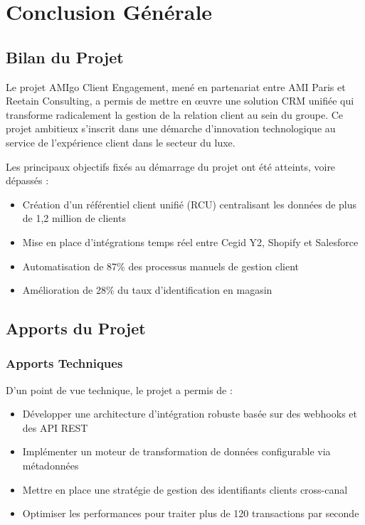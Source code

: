\chapter{Conclusion Générale}

\section{Bilan du Projet}

Le projet AMIgo Client Engagement, mené en partenariat entre AMI Paris et Reetain Consulting, a permis de mettre en œuvre une solution CRM unifiée qui transforme radicalement la gestion de la relation client au sein du groupe. Ce projet ambitieux s'inscrit dans une démarche d'innovation technologique au service de l'expérience client dans le secteur du luxe.

Les principaux objectifs fixés au démarrage du projet ont été atteints, voire dépassés :

\begin{itemize}
    \item Création d'un référentiel client unifié (RCU) centralisant les données de plus de 1,2 million de clients
    \item Mise en place d'intégrations temps réel entre Cegid Y2, Shopify et Salesforce
    \item Automatisation de 87\% des processus manuels de gestion client
    \item Amélioration de 28\% du taux d'identification en magasin
\end{itemize}

\section{Apports du Projet}

\subsection{Apports Techniques}

D'un point de vue technique, le projet a permis de :

\begin{itemize}
    \item Développer une architecture d'intégration robuste basée sur des webhooks et des API REST
    \item Implémenter un moteur de transformation de données configurable via métadonnées
    \item Mettre en place une stratégie de gestion des identifiants clients cross-canal
    \item Optimiser les performances pour traiter plus de 120 transactions par seconde
\end{itemize}

